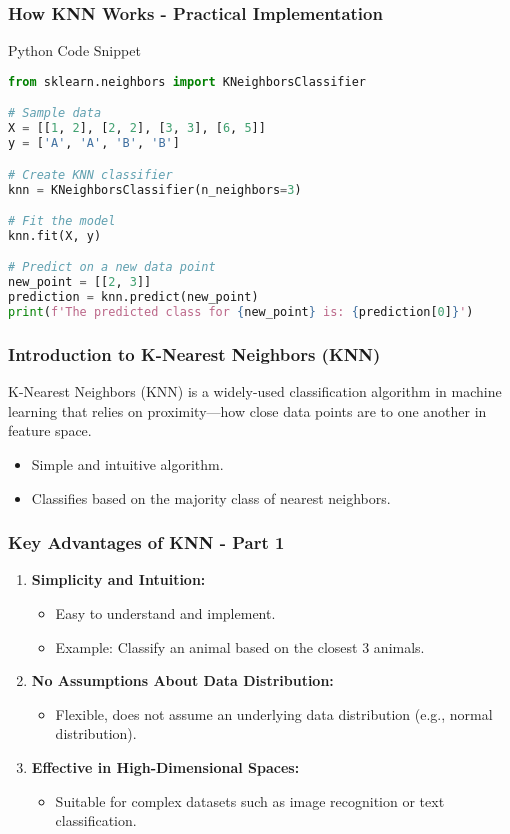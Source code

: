 \documentclass[aspectratio=169]{beamer}
\begin{document}
\begin{frame}[fragile]
    \frametitle{How KNN Works - Practical Implementation}
    \begin{block}{Python Code Snippet}
    \begin{lstlisting}[language=Python]
from sklearn.neighbors import KNeighborsClassifier

# Sample data
X = [[1, 2], [2, 2], [3, 3], [6, 5]]
y = ['A', 'A', 'B', 'B']

# Create KNN classifier
knn = KNeighborsClassifier(n_neighbors=3)

# Fit the model
knn.fit(X, y)

# Predict on a new data point
new_point = [[2, 3]]
prediction = knn.predict(new_point)
print(f'The predicted class for {new_point} is: {prediction[0]}')
    \end{lstlisting}
    \end{block}
\end{frame}

\begin{frame}[fragile]
    \frametitle{Introduction to K-Nearest Neighbors (KNN)}
    K-Nearest Neighbors (KNN) is a widely-used classification algorithm in machine learning that relies on proximity—how close data points are to one another in feature space. 
    \begin{itemize}
        \item Simple and intuitive algorithm.
        \item Classifies based on the majority class of nearest neighbors.
    \end{itemize}
\end{frame}

\begin{frame}[fragile]
    \frametitle{Key Advantages of KNN - Part 1}
    \begin{enumerate}
        \item \textbf{Simplicity and Intuition:}
            \begin{itemize}
                \item Easy to understand and implement.
                \item Example: Classify an animal based on the closest 3 animals.
            \end{itemize}

        \item \textbf{No Assumptions About Data Distribution:} 
            \begin{itemize}
                \item Flexible, does not assume an underlying data distribution (e.g., normal distribution).
            \end{itemize}

        \item \textbf{Effective in High-Dimensional Spaces:} 
            \begin{itemize}
                \item Suitable for complex datasets such as image recognition or text classification.
            \end{itemize}
    \end{enumerate}
\end{frame}
\end{document}
